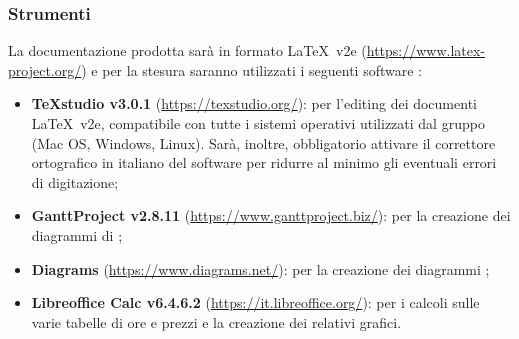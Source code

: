 	\subsubsection{Strumenti}
	La documentazione prodotta sarà in formato \LaTeX\ v2e (\url{https://www.latex-project.org/}) e per la stesura saranno utilizzati i seguenti software :
	\begin{itemize}
		\item \textbf{TeXstudio v3.0.1} (\url{https://texstudio.org/}): per l'editing dei documenti \LaTeX\ v2e, compatibile con tutte i sistemi operativi utilizzati dal gruppo (Mac OS, Windows, Linux). Sarà, inoltre, obbligatorio attivare il correttore ortografico in italiano del software per ridurre al minimo gli eventuali errori di digitazione;
		\item \textbf{GanttProject v2.8.11} (\url{https://www.ganttproject.biz/}): per la creazione dei diagrammi di ;
		\item \textbf{Diagrams} (\url{https://www.diagrams.net/}): per la creazione dei diagrammi ;
		\item \textbf{Libreoffice Calc v6.4.6.2} (\url{https://it.libreoffice.org/}): per i calcoli sulle varie tabelle di ore  e prezzi e la creazione dei relativi grafici.
	\end{itemize}

